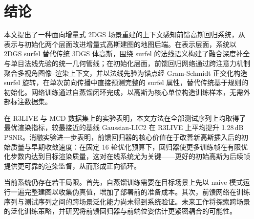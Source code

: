 
\section{结论}

本文提出了一种面向增量式 2DGS 场景重建的上下文感知前馈高斯回归系统，从表示与初始化两个层面改进增量式高斯建图的地图后端。在表示层面，系统以 2DGS surfel 替代传统 3DGS 体高斯，围绕 surfel 的法线语义构建了融合深度补全与单目法线先验的统一几何管线；在初始化层面，前馈回归网络通过跨注意力机制聚合多视角图像--渲染上下文，并以法线先验为锚点经 Gram-Schmidt 正交化构造 surfel 旋转，在单次前向传播中直接预测完整的 surfel 属性，替代传统基于规则的初始化。网络训练通过自蒸馏闭环完成，以高斯为核心单位构造训练样本，无需外部标注数据集。

在 R3LIVE 与 MCD 数据集上的实验表明，本文方法在全部测试序列上均取得了最优渲染指标，较最接近的基线 Gaussian-LIC2 在 R3LIVE 上平均提升 1.28\,dB PSNR。消融实验进一步表明，前馈回归器的核心价值在于改善新高斯插入后的初始质量与早期收敛速度：在固定 16 轮优化预算下，回归器使更多训练帧在有限优化步数内达到目标渲染质量，这对在线系统尤为关键——更好的初始高斯为后续帧提供更可靠的渲染监督，从而形成正向循环。

当前系统仍存在若干局限。首先，自蒸馏训练需要在目标场景上先以 naive 模式运行一遍完整建图以收集伪真值，增加了部署前的准备成本。其次，前馈网络在训练序列与测试序列之间的跨场景泛化能力尚未得到系统验证。未来工作将探索跨场景的泛化训练策略，并研究将前馈回归器与前端位姿估计更紧密耦合的可能性。
